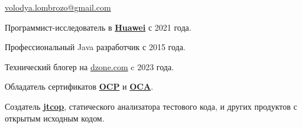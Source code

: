 \documentclass{vl}
\begin{document}
    \vlPrintPhoto{}

    {\bfseries\Large {}}\newline
    \href{mailto:volodya.lombrozo@gmail.com}{volodya.lombrozo@gmail.com}

    \vspace{1em}

    Программист-исследователь в \textbf{\href{https://www.huawei.com}{Huawei}} с 2021 года.

    Профессиональный Java разработчик с 2015 года.

    Технический блогер на \href{https://dzone.com/users/4993224/volodya-lombrozo.html}{dzone.com} c 2023 года.

    Обладатель сертификатов
    \textbf{\href{https://catalog-education.oracle.com/pls/certview/sharebadge?id=87F6A2FE819A5A5AF4120A05900AB28A461EE9A3EE9FBFA02721FADAEB3BCE19}{OCP}}%
    и
    \textbf{\href{https://www.credly.com/badges/e2d9ddda-20dc-433d-8ab7-18548fd0fd8f/public_url}{OCA}}.

    Создатель \textbf{\href{https://github.com/volodya-lombrozo/jtcop}{jtcop}}, статического анализатора тестового кода,
    и других продуктов с открытым исходным кодом.

\end{document}
